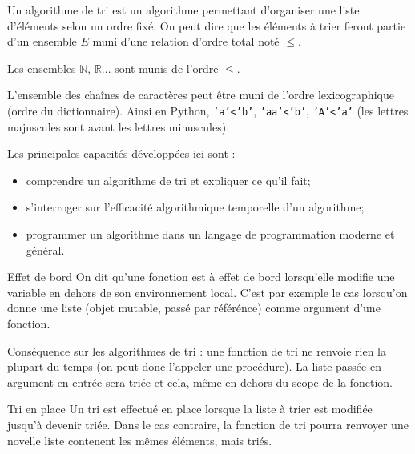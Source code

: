 \begin{obj}

Un algorithme de tri est un algorithme permettant d'organiser une liste d'éléments selon un ordre fixé.  On peut dire que les éléments à trier feront partie d'un ensemble $E$ muni d'une relation d'ordre total noté $\leq$.

Les ensembles $\mathbb{N}$, $\mathbb{R}$... sont munis de l'ordre $\leq$. 

L'ensemble des chaînes de caractères peut être muni de l'ordre lexicographique (ordre du dictionnaire). Ainsi en Python, \texttt{'a'<'b'}, \texttt{'aa'<'b'}, \texttt{'A'<'a'} (les lettres majuscules sont avant les lettres minuscules).

Les principales capacités développées ici sont :
\begin{itemize}
\item comprendre un algorithme de tri et expliquer ce qu'il fait;
\item s'interroger sur l'efficacité algorithmique temporelle d'un algorithme;
\item programmer un algorithme dans un langage de programmation moderne et général.
\end{itemize}

\end{obj}




\begin{defi}{Effet de bord} On dit qu'une fonction est à effet de bord lorsqu'elle modifie une variable  en dehors de son environnement local. C'est par exemple le cas lorsqu'on donne une liste (objet mutable, passé par référénce) comme argument d'une fonction.

Conséquence sur les algorithmes de tri : une fonction de tri ne renvoie rien la plupart du temps (on peut donc l'appeler une procédure). La liste passée en argument en entrée sera triée et cela, même en dehors du scope de la fonction. 
\end{defi}


\begin{defi}{Tri en place} 
Un tri est effectué en place lorsque la liste à trier est modifiée jusqu'à devenir triée. Dans le cas contraire, la fonction de tri pourra renvoyer une novelle liste contenent les mêmes éléments, mais triés. 
\end{defi}


